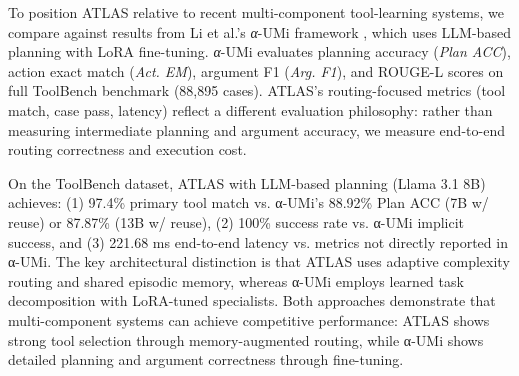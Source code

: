 \documentclass[conference]{IEEEtran}
\begin{document}
To position ATLAS relative to recent multi-component tool-learning systems, we compare against results from Li et al.'s \textit{α}-UMi framework \cite{li2024uumi}, which uses LLM-based planning with LoRA fine-tuning. \textit{α}-UMi evaluates planning accuracy (\textit{Plan ACC}), action exact match (\textit{Act. EM}), argument F1 (\textit{Arg. F1}), and ROUGE-L scores on full ToolBench benchmark (88,895 cases). ATLAS's routing-focused metrics (tool match, case pass, latency) reflect a different evaluation philosophy: rather than measuring intermediate planning and argument accuracy, we measure end-to-end routing correctness and execution cost.

On the ToolBench dataset, ATLAS with LLM-based planning (Llama 3.1 8B) achieves: (1) 97.4\% primary tool match vs. α-UMi's 88.92\% Plan ACC (7B w/ reuse) or 87.87\% (13B w/ reuse), (2) 100\% success rate vs. α-UMi implicit success, and (3) 221.68 ms end-to-end latency vs. metrics not directly reported in α-UMi. The key architectural distinction is that ATLAS uses adaptive complexity routing and shared episodic memory, whereas α-UMi employs learned task decomposition with LoRA-tuned specialists. Both approaches demonstrate that multi-component systems can achieve competitive performance: ATLAS shows strong tool selection through memory-augmented routing, while α-UMi shows detailed planning and argument correctness through fine-tuning.

\begin{table}[htbp]
\caption{Architectural comparison: ATLAS (LLM-based) vs. \textit{α}-UMi and decomposition baselines. Bold indicates best results in metric category.}
\centering
{}
\label{tab:arch-comparison}
\end{table}
\end{document}
